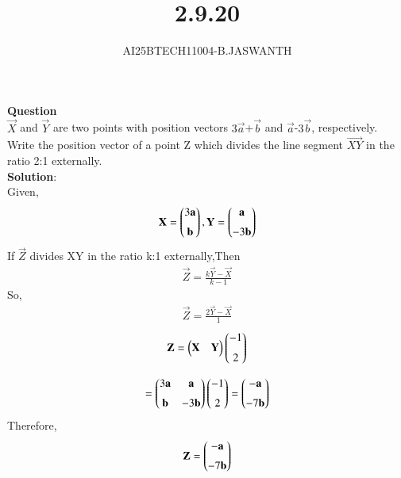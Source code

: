 \documentclass[journal]{IEEEtran}
\begin{document}

\vspace{3cm}


\renewcommand{\thetable}{\theenumi}




\vspace{3cm}


\title{2.9.20}
\author{AI25BTECH11004-B.JASWANTH}
{\let\newpage\relax\maketitle}


\renewcommand{\thefigure}{\theenumi}
\renewcommand{\thetable}{\theenumi}
\setlength{\intextsep}{10pt} %

\textbf{Question}\\
$\vec{X}$ and  $\vec{Y}$ are two points with position vectors $3\vec{a}$+$\vec{b}$  and  $\vec{a}$-$3\vec{b}$, respectively. Write the position vector of a point Z  which divides the line segment  $\vec{XY}$ in the ratio 2:1 externally.\\
\textbf{Solution}:\\
Given,
\begin{align}
    \mathbf{X}=\begin{pmatrix}3\mathbf{a}\\[6pt]
    \mathbf{b}\end{pmatrix} ,\mathbf{Y}=\begin{pmatrix}\mathbf{a}\\[6pt]
                        -3\mathbf{b}\end{pmatrix}
\end{align}
If $\vec{Z}$ divides XY in the ratio k:1 externally,Then
\begin{align}
\vec{Z} = \frac{k\vec{Y} - \vec{X}}{k-1}
\end{align}
So,
\begin{align}
 \vec{Z} = \frac{2\vec{Y} - \vec{X}}{1}   
\end{align}
\begin{align}
\mathbf{Z} = \begin{pmatrix}\mathbf{X} & \mathbf{Y} \end{pmatrix}
\begin{pmatrix}-1 \\[6pt]
2\end{pmatrix}
\end{align}


\begin{align}
    =
\begin{pmatrix}3\mathbf{a} & \mathbf{a} \\[6pt]
\mathbf{b} & -3\mathbf{b}\end{pmatrix}
\begin{pmatrix}-1 \\[6pt]
2\end{pmatrix}
=
\begin{pmatrix}-\mathbf{a} \\[6pt]
-7\mathbf{b}\end{pmatrix}
\end{align}
Therefore,
\begin{align}
    \mathbf{Z}=\begin{pmatrix}-\mathbf{a} \\[6pt]
-7\mathbf{b}\end{pmatrix}
\end{align}
\end{document}
